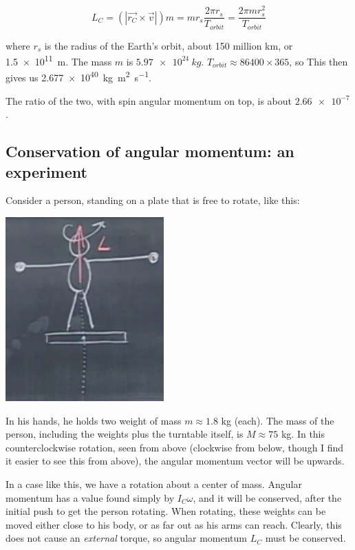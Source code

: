 \documentclass[12pt,a4paper]{report}
\begin{document}
\begin{equation}
L_C = (|\vec{r_C} \times \vec{v}|) m = m r_s \frac{2 \pi r_s}{T_{orbit}} = \frac{2 \pi m r_s^2}{T_{orbit}}
\end{equation}

where $r_s$ is the radius of the Earth's orbit, about 150 million km, or \SI{1.5e11}{m}. The mass $m$ is $\SI{5.97e24}{kg}$. $T_{orbit} \approx 86400 \times 365$, so
This then gives us \SI{2.677e40}{kg m^2 s^{-1}}.

The ratio of the two, with spin angular momentum on top, is about $\num{2.66e-7}$.

\subsection{Conservation of angular momentum: an experiment}

Consider a person, standing on a plate that is free to rotate, like this:

\begin{center}
\includegraphics[scale=0.7]{Graphics/lec20_cons_angular_momentum}
\end{center}

In his hands, he holds two weight of mass $m \approx 1.8$ kg (each). The mass of the person, including the weights plus the turntable itself, is $M \approx 75$ kg.
In this counterclockwise rotation, seen from above (clockwise from below, though I find it easier to see this from above), the angular momentum vector will be upwards.

In a case like this, we have a rotation about a center of mass. Angular momentum has a value found simply by $I_C \omega$, and it will be conserved, after the initial push to get the person rotating. When rotating, these weights can be moved either close to his body, or as far out as his arms can reach. Clearly, this does not cause an \emph{external} torque, so angular momentum $L_C$ must be conserved.
\end{document}
